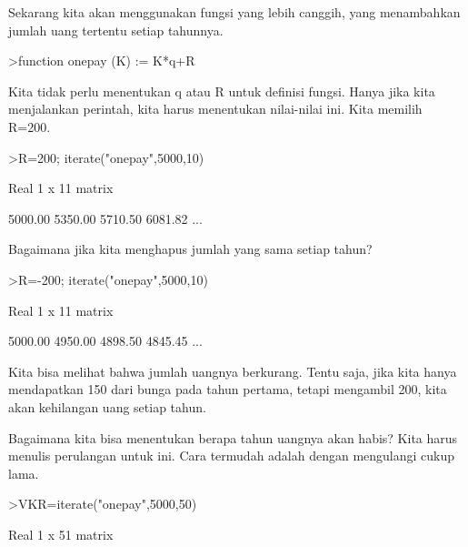 \documentclass[12pt,arial,letterpaper]{book}
\begin{document}
\begin{eulercomment}
\begin{eulercomment}
\begin{eulercomment}
\begin{eulercomment}
\begin{eulercomment}
\begin{eulercomment}
\begin{eulercomment}
\begin{eulercomment}
\begin{eulercomment}
\begin{eulercomment}
\begin{eulercomment}
\begin{eulercomment}
\begin{eulercomment}
Sekarang kita akan menggunakan fungsi yang lebih canggih, yang
menambahkan jumlah uang tertentu setiap tahunnya.
\end{eulercomment}
\begin{eulerprompt}
>function onepay (K) := K*q+R
\end{eulerprompt}
\begin{eulercomment}
Kita tidak perlu menentukan q atau R untuk definisi fungsi. Hanya jika
kita menjalankan perintah, kita harus menentukan nilai-nilai ini. Kita
memilih R=200.
\end{eulercomment}
\begin{eulerprompt}
>R=200; iterate("onepay",5000,10)
\end{eulerprompt}
\begin{euleroutput}
  Real 1 x 11 matrix
  
      5000.00     5350.00     5710.50     6081.82     ...
\end{euleroutput}
\begin{eulercomment}
Bagaimana jika kita menghapus jumlah yang sama setiap tahun?
\end{eulercomment}
\begin{eulerprompt}
>R=-200; iterate("onepay",5000,10)
\end{eulerprompt}
\begin{euleroutput}
  Real 1 x 11 matrix
  
      5000.00     4950.00     4898.50     4845.45     ...
\end{euleroutput}
\begin{eulercomment}
Kita bisa melihat bahwa jumlah uangnya berkurang. Tentu saja, jika
kita hanya mendapatkan 150 dari bunga pada tahun pertama, tetapi
mengambil 200, kita akan kehilangan uang setiap tahun.

Bagaimana kita bisa menentukan berapa tahun uangnya akan habis? Kita
harus menulis perulangan untuk ini. Cara termudah adalah dengan
mengulangi cukup lama.
\end{eulercomment}
\begin{eulerprompt}
>VKR=iterate("onepay",5000,50)
\end{eulerprompt}
\begin{euleroutput}
  Real 1 x 51 matrix
  

\end{euleroutput}
\end{eulercomment}
\end{eulercomment}
\end{eulercomment}
\end{eulercomment}
\end{eulercomment}
\end{eulercomment}
\end{eulercomment}
\end{eulercomment}
\end{eulercomment}
\end{eulercomment}
\end{eulercomment}
\end{eulercomment}
\end{document}
